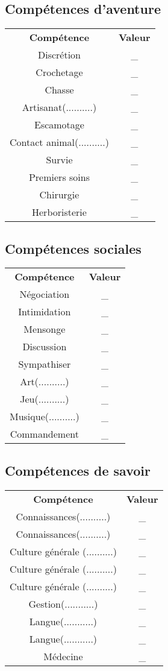 \documentclass[10pt,a4paper]{article}
\begin{document}
\begin{multicols}{3}
   \columnbreak
  \subsection*{Compétences d'aventure}
  \begin{tabular}{cc}
  \textbf{Compétence}& \textbf{Valeur}\\
  Discrétion& \_\\
  Crochetage & \_\\
  Chasse& \_\\
  Artisanat(..........)& \_\\
  Escamotage& \_\\
  Contact animal(..........)& \_\\
  Survie& \_\\
  Premiers soins& \_\\
  Chirurgie& \_\\
  Herboristerie& \_\\
  \end{tabular}
  
  \subsection*{Compétences sociales}
  \begin{tabular}{cc}
  \textbf{Compétence}& \textbf{Valeur}\\
  Négociation& \_\\
  Intimidation& \_\\
  Mensonge& \_\\
  Discussion& \_\\
  Sympathiser& \_\\
  Art(..........)& \_\\
  Jeu(..........)& \_\\
  Musique(..........)& \_\\
  Commandement& \_\\
  \end{tabular}
  \subsection*{Compétences de savoir}
  \begin{tabular}{cc}
  \textbf{Compétence}& \textbf{Valeur}\\
  Connaissances(..........)& \_\\
  Connaissances(..........)& \_\\
  Culture générale (..........)& \_\\
  Culture générale (..........)& \_\\
  Culture générale (..........)& \_\\
  Gestion(...........)& \_\\
  Langue(...........)& \_\\
  Langue(...........)& \_\\
  Médecine& \_\\
  \end{tabular}
\end{multicols}
\end{document}
